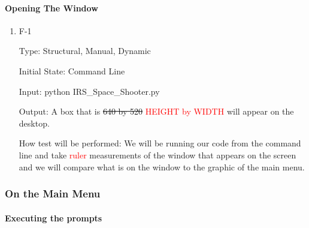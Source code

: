 \documentclass[12pt, titlepage]{article}
\begin{document}
\paragraph{Opening The Window}

\begin{enumerate}

\item{F-1\\}

Type: Structural, Manual, Dynamic
                    
Initial State: Command Line
                    
Input: python IRS\_Space\_Shooter.py
                    
Output: A box that is \sout{640 by 520} \textcolor{red}{HEIGHT by WIDTH} will appear on the desktop.
                    
How test will be performed: We will be running our code from the command line and take \textcolor{red}{ruler} measurements of the window that appears on the screen and we will compare what is on the window to the graphic of the main menu.

\end{enumerate}

\subsubsection{On the Main Menu}

\paragraph{Executing the prompts}
\end{document}
